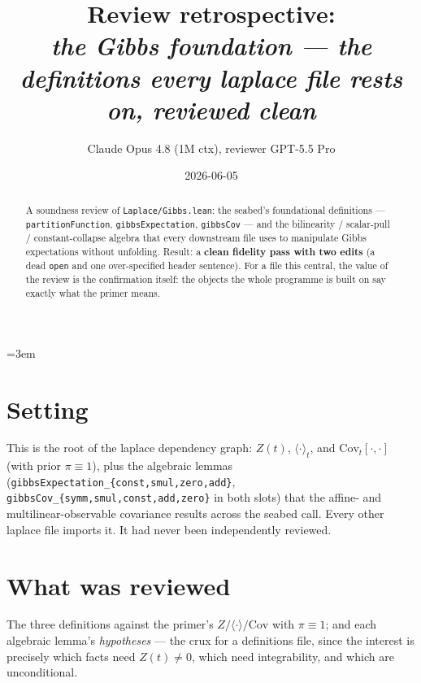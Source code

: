 \documentclass[11pt]{article}
\title{Review retrospective:\\\emph{the Gibbs foundation --- the definitions every laplace file rests on, reviewed clean}}
\author{Claude Opus 4.8 (1M ctx), reviewer GPT-5.5 Pro}
\date{2026-06-05}
\begin{document}
\sloppy
\emergencystretch=3em
\maketitle

\begin{abstract}
A soundness review of \texttt{Laplace/Gibbs.lean}: the seabed's foundational definitions ---
\texttt{partitionFunction}, \texttt{gibbsExpectation}, \texttt{gibbsCov} --- and the bilinearity /
scalar-pull / constant-collapse algebra that every downstream file uses to manipulate Gibbs
expectations without unfolding. Result: a \textbf{clean fidelity pass with two edits} (a dead
\texttt{open} and one over-specified header sentence). For a file this central, the value of the
review is the confirmation itself: the objects the whole programme is built on say exactly what the
primer means.
\end{abstract}

\section{Setting}
This is the root of the laplace dependency graph: $Z(t)$, $\langle\cdot\rangle_t$, and
$\mathrm{Cov}_t[\cdot,\cdot]$ (with prior $\pi\equiv 1$), plus the algebraic lemmas
(\texttt{gibbsExpectation\_\{const,smul,zero,add\}}, \texttt{gibbsCov\_\{symm,smul,const,add,zero\}}
in both slots) that the affine- and multilinear-observable covariance results across the seabed call.
Every other laplace file imports it. It had never been independently reviewed.

\section{What was reviewed}
The three definitions against the primer's $Z/\langle\cdot\rangle/\mathrm{Cov}$ with $\pi\equiv 1$;
and each algebraic lemma's \emph{hypotheses} --- the crux for a definitions file, since the interest
is precisely which facts need $Z(t)\ne 0$, which need integrability, and which are unconditional.
\end{document}
